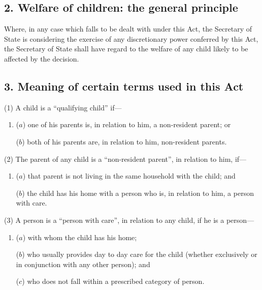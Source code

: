\documentclass[a4paper]{article}
\begin{document}

\subsection{2. Welfare of children: the general principle}

Where, in any case which falls to be dealt with under this Act, the Secretary of State is considering the exercise of any discretionary power conferred by this
Act, the Secretary of State shall have regard to the welfare of any child likely to be
affected by the decision.


\subsection{3. Meaning of certain terms used in this Act}

(1) A child is a “qualifying child” if---
\begin{enumerate}\item[]
($a$) one of his parents is, in relation to him, a non-resident parent; or

($b$) both of his parents are, in relation to him, non-resident parents.
\end{enumerate}

(2) The parent of any child is a “non-resident parent”, in relation to him, if---

\begin{enumerate}\item[]
($a$)
that parent is not living in the same household with the child; and

($b$)
the child has his home with a person who is, in relation to him, a person
with care.
\end{enumerate}

(3)
A person is a “person with care”, in relation to any child, if he is a person---
\begin{enumerate}\item[]
($a$)
with whom the child has his home;

($b$)
who usually provides day to day care for the child (whether exclusively
or in conjunction with any other person); and

($c$)
who does not fall within a prescribed category of person.
\end{enumerate}
\end{document}
